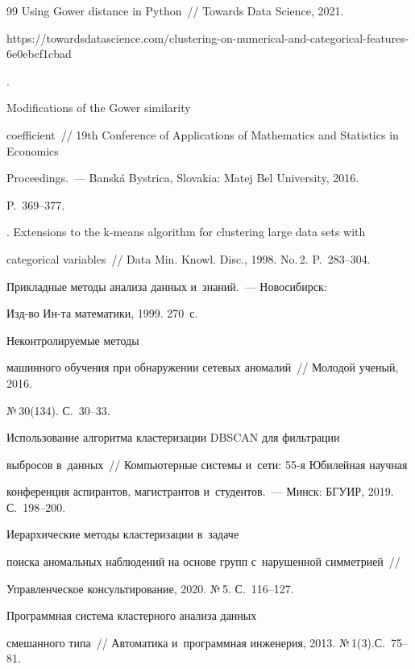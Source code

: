 {{\begin{thebibliography}{99}
Using Gower distance in Python~/\!\!/ Towards Data Science, 2021. {\sf 


https://\linebreak towardsdatascience.com/clustering-on-numerical-and-categorical-features- 6e0ebcf1cbad}.




   Modifications of the Gower similarity 


coefficient~/\!\!/ 19th Conference of Applications of Mathematics and Statistics in Economics 


Proceedings.~--- Bansk\'{a} Bystrica, Slovakia: Matej Bel University, 2016.  


P.~369--377.




  . Extensions to the k-means algorithm for clustering large data sets with 


categorical variables~/\!\!/ Data Min. Knowl. Disc., 1998. No.\,2. P.~283--304.




   Прикладные методы анализа данных и~знаний.~--- Новосибирск:  


Изд-во Ин-та математики, 1999. 270~с.




   Неконтролируемые методы 


машинного обучения при обнаружении сетевых аномалий~/\!\!/ Молодой ученый, 2016. 


№\,30(134). С.~30--33.




   Использование алгоритма кластеризации DBSCAN для фильтрации 


выбросов в~данных~/\!\!/ Компьютерные системы и~сети: 55-я Юбилейная научная 


конференция аспирантов, магистрантов и~студентов.~--- Минск: БГУИР, 2019. С.~198--200.




   Иерархические методы кластеризации в~задаче 


поиска аномальных наблюдений на основе групп с~нарушенной симметрией~/\!\!/ 


Управленческое консультирование, 2020. №\,5. С.~116--127.




   Программная система кластерного анализа данных 


смешанного типа~/\!\!/ Автоматика и~программная инженерия, 2013. №\,1(3).\linebreak С.~75--81.





 \end{thebibliography}


} }
